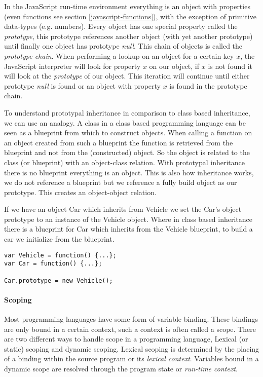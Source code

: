 In the JavaScript run-time environment everything is an object with properties (even functions see section \ref{javascript-functions}), with the exception of primitive data-types (e.g. numbers). Every object has one special property called the \textit{prototype}, this prototype references another object (with yet another prototype) until finally one object has prototype \textit{null}. This chain of objects is called the \textit{prototype chain}. When performing a lookup on an object for a certain key $x$, the JavaScript interpreter will look for property $x$ on our object, if $x$ is not found it will look at the \textit{prototype} of our object. This iteration will continue until either prototype \textit{null} is found or an object with property $x$ is found in the prototype chain.

To understand prototypal inheritance in comparison to class based inheritance, we can use an analogy. A class in a class based programming language can be seen as a blueprint from which to construct objects. When calling a function on an object created from such a blueprint the function is retrieved from the blueprint and not from the (constructed) object. So the object is related to the class (or blueprint) with an object-class relation. With prototypal inheritance there is no blueprint everything is an object. This is also how inheritance works, we do not reference a blueprint but we reference a fully build object as our prototype. This creates an object-object relation.

If we have an object Car which inherits from Vehicle we set the Car's object prototype to an instance of the Vehicle object. Where in class based inheritance there is a blueprint for Car which inherits from the Vehicle blueprint, to build a car we initialize from the blueprint.

\begin{lstlisting}
var Vehicle = function() {...};
var Car = function() {...};

Car.prototype = new Vehicle();
\end{lstlisting}

\paragraph{Scoping} \label{javascript-scoping}
Most programming languages have some form of variable binding. These bindings are only bound in a certain context, such a context is often called a scope. There are two different ways to handle scope in a programming language, Lexical (or static) scoping and dynamic scoping. Lexical scoping is determined by the placing of a binding within the source program or its \textit{lexical context}. Variables bound in a dynamic scope are resolved through the program state or \textit{run-time context}.

